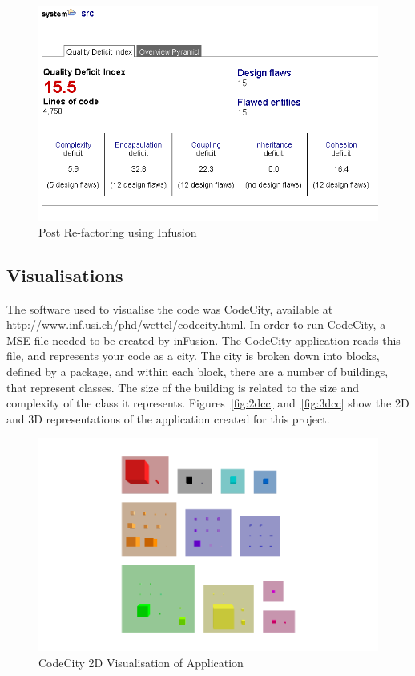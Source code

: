 \begin{figure}[H]
\begin{center}
\includegraphics[scale=0.7]{infusion2.PNG}
\caption{Post Re-factoring using Infusion}
\end{center}
\end{figure}

\subsection{Visualisations}

The software used to visualise the code was CodeCity, available at \hyperref[Code City]{http://www.inf.usi.ch/phd/wettel/codecity.html}. In order to run CodeCity, a MSE file needed to be created by inFusion. The CodeCity application reads this file, and represents your code as a city. The city is broken down into blocks, defined by a package, and within each block, there are a number of buildings, that represent classes. The size of the building is related to the size and complexity of the class it represents. Figures~\ref{fig:2dcc} and~\ref{fig:3dcc} show the 2D and 3D representations of the application created for this project. 
 
\begin{figure}[H]
\begin{center}
\includegraphics[scale=0.5]{codecity2d.png}
\caption{CodeCity 2D Visualisation of Application}
\end{center}
\end{figure}

